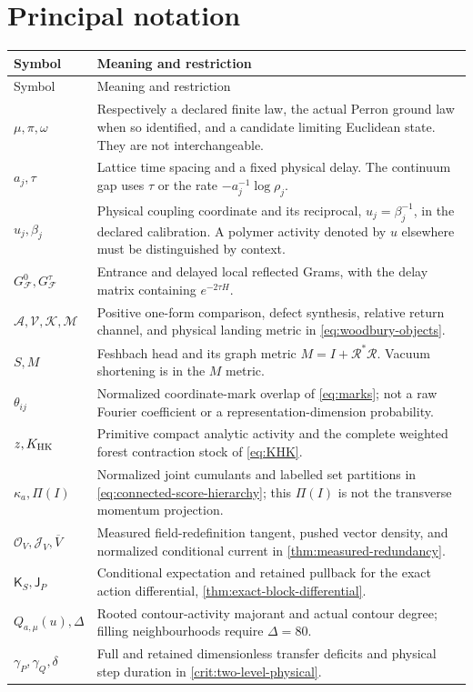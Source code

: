 \documentclass[11pt,oneside,openany]{book}
\theoremstyle{definition}
\theoremstyle{remark}
\begin{document}
\section{Principal notation}
\begin{longtable}{L{0.23\textwidth}L{0.70\textwidth}}
\toprule Symbol & Meaning and restriction \\ \midrule
\endfirsthead
\toprule Symbol & Meaning and restriction \\ \midrule
\endhead
$\mu,\pi,\omega$ & Respectively a declared finite law, the actual Perron ground law when so identified, and a candidate limiting Euclidean state. They are not interchangeable. \\
$a_j,\tau$ & Lattice time spacing and a fixed physical delay. The continuum gap uses $\tau$ or the rate $-a_j^{-1}\log\rho_j$. \\
$u_j,\beta_j$ & Physical coupling coordinate and its reciprocal, $u_j=\beta_j^{-1}$, in the declared calibration. A polymer activity denoted by $u$ elsewhere must be distinguished by context. \\
$G_{\mathcal F}^0,G_{\mathcal F}^\tau$ & Entrance and delayed local reflected Grams, with the delay matrix containing $e^{-2\tau H}$. \\
$\mathcal A,\mathcal V,\mathcal K,\mathcal M$ & Positive one-form comparison, defect synthesis, relative return channel, and physical landing metric in \cref{eq:woodbury-objects}. \\
$S,M$ & Feshbach head and its graph metric $M=I+\mathcal R^*\mathcal R$. Vacuum shortening is in the $M$ metric. \\
$\theta_{ij}$ & Normalized coordinate-mark overlap of \cref{eq:marks}; not a raw Fourier coefficient or a representation-dimension probability. \\
$z,K_{\rm HK}$ & Primitive compact analytic activity and the complete weighted forest contraction stock of \cref{eq:KHK}. \\
$\kappa_a,\Pi(I)$ & Normalized joint cumulants and labelled set partitions in \cref{eq:connected-score-hierarchy}; this $\Pi(I)$ is not the transverse momentum projection. \\
$\mathcal O_V,\mathcal J_V,\overline V$ & Measured field-redefinition tangent, pushed vector density, and normalized conditional current in \cref{thm:measured-redundancy}. \\
$\mathsf K_S,\mathsf J_P$ & Conditional expectation and retained pullback for the exact action differential, \cref{thm:exact-block-differential}. \\
$Q_{a,\mu}(u),\Delta$ & Rooted contour-activity majorant and actual contour degree; filling neighbourhoods require $\Delta=80$. \\
$\gamma_P,\gamma_Q,\delta$ & Full and retained dimensionless transfer deficits and physical step duration in \cref{crit:two-level-physical}. \\


\end{longtable}
\end{document}
